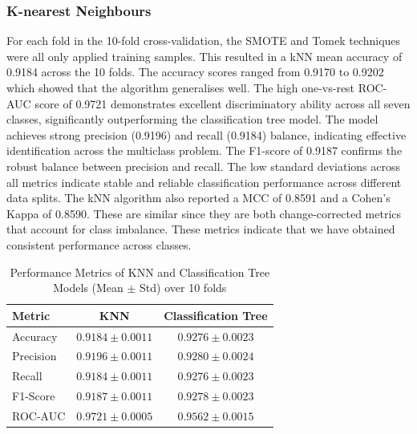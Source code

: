 \documentclass[10pt, conference]{IEEEtran}
\begin{document}
\subsubsection{K-nearest Neighbours}

For each fold in the 10-fold cross-validation, the SMOTE and Tomek techniques were all only applied training samples. This resulted in a kNN mean accuracy of 0.9184 across the 10 folds. The accuracy scores ranged from 0.9170 to 0.9202 which showed that the algorithm generalises well. The high one-vs-rest ROC-AUC score of 0.9721 demonstrates excellent discriminatory ability across all seven classes, significantly outperforming the classification tree model. The model achieves strong precision (0.9196) and recall (0.9184) balance, indicating effective identification across the multiclass problem. The F1-score of 0.9187 confirms the robust balance between precision and recall. The low standard deviations across all metrics indicate stable and reliable classification performance across different data splits. The kNN algorithm also reported a MCC of 0.8591 and a Cohen's  Kappa of 0.8590. These are similar since they are both change-corrected metrics that account for class imbalance. These metrics indicate that we have obtained consistent performance across classes.

\begin{table}[htbp]
	\centering
	\caption{Performance Metrics of KNN and Classification Tree Models (Mean $\pm$ Std) over 10 folds}
	\label{tab:model_comparison}
	\begin{tabular}{|l|c|c|}
		\hline
		\textbf{Metric} & \textbf{KNN} & \textbf{Classification Tree} \\
		\hline
		Accuracy & $0.9184 \pm 0.0011$ & $0.9276 \pm 0.0023$ \\
		Precision & $0.9196 \pm 0.0011$ & $0.9280 \pm 0.0024$ \\
		Recall & $0.9184 \pm 0.0011$ & $0.9276 \pm 0.0023$ \\
		F1-Score & $0.9187 \pm 0.0011$ & $0.9278 \pm 0.0023$ \\
		ROC-AUC & $0.9721 \pm 0.0005$ & $0.9562 \pm 0.0015$ \\
		\hline
	\end{tabular}
\end{table}
\end{document}
